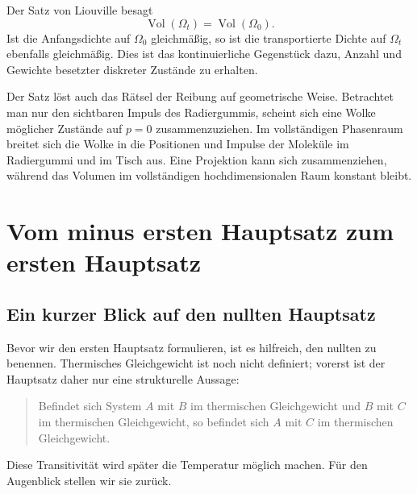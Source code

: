 Der Satz von Liouville besagt
\begin{equation}
 \operatorname{Vol}(\Omega_t)
 =
 \operatorname{Vol}(\Omega_0).
 \label{eq:sm1-liouville-volume}
\end{equation}
Ist die Anfangsdichte auf \(\Omega_0\) gleichmäßig, so ist die transportierte Dichte auf \(\Omega_t\) ebenfalls gleichmäßig. Dies ist das kontinuierliche Gegenstück dazu, Anzahl und Gewichte besetzter diskreter Zustände zu erhalten.

Der Satz löst auch das Rätsel der Reibung auf geometrische Weise. Betrachtet man nur den sichtbaren Impuls des Radiergummis, scheint sich eine Wolke möglicher Zustände auf \(p=0\) zusammenzuziehen. Im vollständigen Phasenraum breitet sich die Wolke in die Positionen und Impulse der Moleküle im Radiergummi und im Tisch aus. Eine Projektion kann sich zusammenziehen, während das Volumen im vollständigen hochdimensionalen Raum konstant bleibt.

\begin{classroomqa}\end{classroomqa}

\section{Vom minus ersten Hauptsatz zum ersten Hauptsatz}

\subsection{Ein kurzer Blick auf den nullten Hauptsatz}

Bevor wir den ersten Hauptsatz formulieren, ist es hilfreich, den nullten zu benennen. Thermisches Gleichgewicht ist noch nicht definiert; vorerst ist der Hauptsatz daher nur eine strukturelle Aussage:
\begin{quote}
Befindet sich System \(A\) mit \(B\) im thermischen Gleichgewicht und \(B\) mit \(C\) im thermischen Gleichgewicht, so befindet sich \(A\) mit \(C\) im thermischen Gleichgewicht.
\end{quote}
Diese Transitivität wird später die Temperatur möglich machen. Für den Augenblick stellen wir sie zurück.

